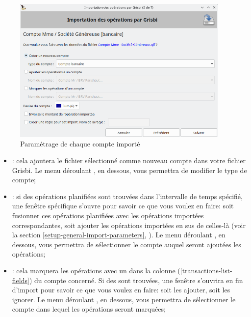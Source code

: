 \begin{enumerate}
	\begin{figure}[htbp]
		\begin{center}
		\includegraphics[width=0.95\textwidth]{image/screenshot/importexport_import_files_setup}
		\end{center}
		\caption{Paramétrage de chaque compte importé}
		\label{importexport-import-files-setup-img}
	\end{figure}
		\begin{itemize}
			\item {}: cela ajoutera le fichier sélectionné comme nouveau compte dans votre fichier Grisbi. Le menu déroulant , en dessous, vous permettra de modifier le type de compte;
			\item {}: si des opérations planifiées sont trouvées dans l'intervalle de temps spécifié, une fenêtre spécifique s'ouvre pour savoir ce que vous voulez en faire: soit fusionner ces opérations planifiées avec les opérations importées correspondantes, soit ajouter les opérations importées en sus de celles-là (voir la section \vref{setup-general-import-parameters}, ). Le menu déroulant , en dessous, vous permettra de sélectionner le compte auquel seront ajoutées les opérations;
			\item {}: cela marquera les opérations avec un  dans la colonne  (\vref{transactions-list-fields}) du compte concerné. Si des  sont trouvées, une fenêtre s'ouvrira en fin d'import pour savoir ce que vous voulez en faire: soit les ajouter, soit les ignorer. Le menu déroulant , en dessous, vous permettra de sélectionner le compte dans lequel les opérations seront marquées;

\end{itemize}
\end{enumerate}
